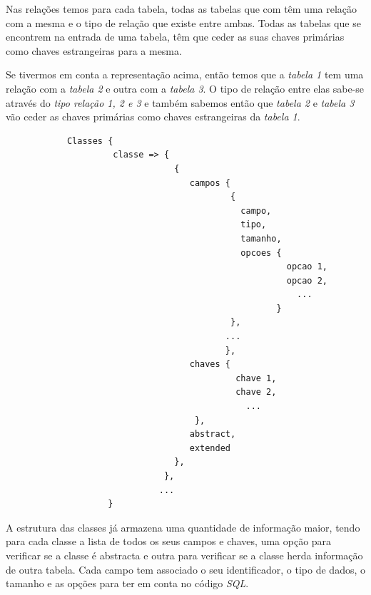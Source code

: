 \documentclass[a4paper]{article}
\begin{document}
\hspace{1cm}Nas relações temos para cada tabela, todas as tabelas que com têm uma relação com a mesma e o tipo de relação que existe entre ambas. Todas as tabelas que se encontrem na entrada de uma tabela, têm que ceder as suas chaves primárias como chaves estrangeiras para a mesma.

\hspace{1cm}Se tivermos em conta a representação acima, então temos que a {\em tabela 1} tem uma relação com a {\em tabela 2} e outra com a {\em tabela 3}. O tipo de relação entre elas sabe-se através do {\em tipo relação 1, 2 e 3} e também sabemos então que {\em tabela 2} e {\em tabela 3} vão ceder as chaves primárias como chaves estrangeiras da {\em tabela 1}.

\begin{small}
\begin{lstlisting}
            Classes {
                     classe => {
                                 {
                                    campos {
                                            {
                                              campo,
                                              tipo,
                                              tamanho,
                                              opcoes {
                                                       opcao 1,
                                                       opcao 2,
                                                         ...
                                                     }
                                            },
                                           ...
                                           },
                                    chaves {
                                             chave 1,
                                             chave 2,
                                               ...
                                     },
                                    abstract,
                                    extended
                                 },
                               },
                              ...
                    }
\end{lstlisting}
\end{small}

\hspace{1cm}A estrutura das classes já armazena uma quantidade de informação maior, tendo para cada classe a lista de todos os seus campos e chaves, uma opção para verificar se a classe é abstracta e outra para verificar se a classe herda informação de outra tabela. Cada campo tem associado o seu identificador, o tipo de dados, o tamanho e as opções para ter em conta no código {\em SQL}.
\end{document}
